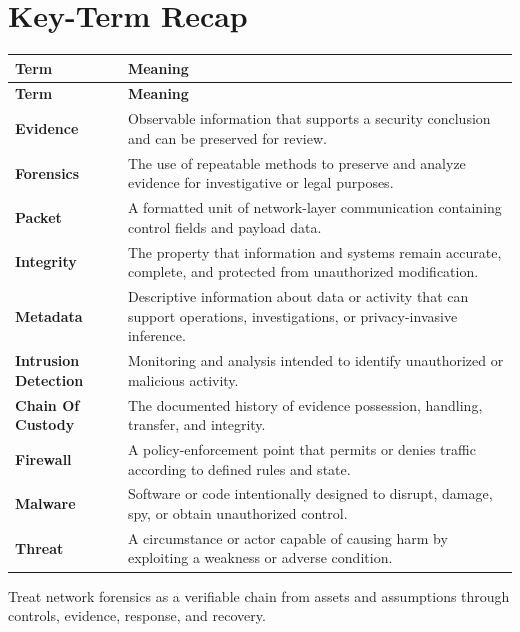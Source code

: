 \documentclass[11pt]{article}
\begin{document}
\section*{Key-Term Recap}
\begin{longtable}{>{\RaggedRight\arraybackslash}p{}>{\RaggedRight\arraybackslash}p{}}
\toprule\rowcolor{Navy}\color{white}\textbf{Term} & \color{white}\textbf{Meaning}\\\midrule
\endfirsthead
\toprule\rowcolor{Navy}\color{white}\textbf{Term} & \color{white}\textbf{Meaning}\\\midrule
\endhead
\textbf{Evidence} & Observable information that supports a security conclusion and can be preserved for review. \\\midrule
\textbf{Forensics} & The use of repeatable methods to preserve and analyze evidence for investigative or legal purposes. \\\midrule
\textbf{Packet} & A formatted unit of network-layer communication containing control fields and payload data. \\\midrule
\textbf{Integrity} & The property that information and systems remain accurate, complete, and protected from unauthorized modification. \\\midrule
\textbf{Metadata} & Descriptive information about data or activity that can support operations, investigations, or privacy-invasive inference. \\\midrule
\textbf{Intrusion Detection} & Monitoring and analysis intended to identify unauthorized or malicious activity. \\\midrule
\textbf{Chain Of Custody} & The documented history of evidence possession, handling, transfer, and integrity. \\\midrule
\textbf{Firewall} & A policy-enforcement point that permits or denies traffic according to defined rules and state. \\\midrule
\textbf{Malware} & Software or code intentionally designed to disrupt, damage, spy, or obtain unauthorized control. \\\midrule
\textbf{Threat} & A circumstance or actor capable of causing harm by exploiting a weakness or adverse condition. \\\midrule
\bottomrule
\end{longtable}
\begin{takeawaybox}
Treat network forensics as a verifiable chain from assets and assumptions through controls, evidence, response, and recovery.
\end{takeawaybox}
\end{document}
